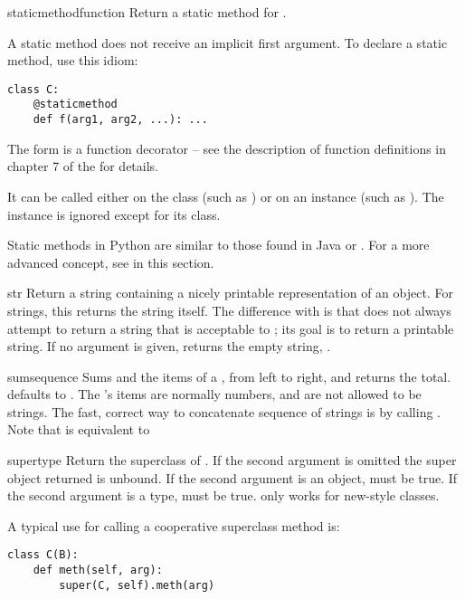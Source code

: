 \begin{funcdesc}{staticmethod}{function}
  Return a static method for .

  A static method does not receive an implicit first argument.
  To declare a static method, use this idiom:

\begin{verbatim}
class C:
    @staticmethod
    def f(arg1, arg2, ...): ...
\end{verbatim}

  The  form is a function decorator -- see the description
  of function definitions in chapter 7 of the
   for details.

  It can be called either on the class (such as ) or on an
  instance (such as ).  The instance is ignored except
  for its class.

  Static methods in Python are similar to those found in Java or \Cpp.
  For a more advanced concept, see  in this
  section.
\end{funcdesc}

\begin{funcdesc}{str}{}
  Return a string containing a nicely printable representation of an
  object.  For strings, this returns the string itself.  The
  difference with  is that
   does not always attempt to return a string
  that is acceptable to ; its goal is to return a
  printable string.  If no argument is given, returns the empty
  string, .
\end{funcdesc}

\begin{funcdesc}{sum}{sequence}
  Sums  and the items of a , from left to
  right, and returns the total.   defaults to .
  The 's items are normally numbers, and are not allowed
  to be strings.  The fast, correct way to concatenate sequence of
  strings is by calling .
  Note that  is equivalent to
\end{funcdesc}

\begin{funcdesc}{super}{type}
  Return the superclass of .  If the second argument is omitted
  the super object returned is unbound.  If the second argument is an
  object,  must be true.  If
  the second argument is a type,  must be true.
   only works for new-style classes.

  A typical use for calling a cooperative superclass method is:
\begin{verbatim}
class C(B):
    def meth(self, arg):
        super(C, self).meth(arg)
\end{verbatim}
\end{funcdesc}

